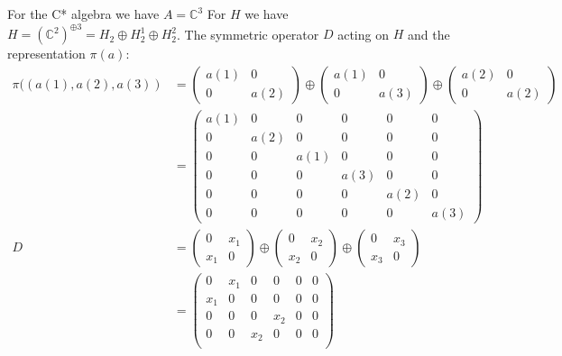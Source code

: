 \documentclass[a4paper]{article}
\newcounter{exercise}
\newenvironment{MyExercise}%
{\begin{mdframed}[style=exercisestyle]}{\end{mdframed}}
\theoremstyle{definition}
\theoremstyle{definition}
\theoremstyle{definition}
\theoremstyle{theorem}
\theoremstyle{theorem}
\begin{document}
\begin{MyExercise}
    For the C* algebra we have $A=\mathbb{C}^3$
    For $H$ we have $H = (\mathbb{C}^2)^{\oplus 3} = H_2 \oplus H_2^1 \oplus H_2^2$.
    The symmetric operator $D$ acting on $H$ and the representation $\pi (a)$:
    \begin{align}
        \pi((a(1), a(2), a(3)) &=
        \begin{pmatrix}
            a(1) & 0 \\ 0 & a(2)
        \end{pmatrix} \oplus
        \begin{pmatrix}
            a(1) & 0 \\ 0 & a(3)
        \end{pmatrix} \oplus
        \begin{pmatrix}
            a(2) & 0 \\ 0 & a(2)
        \end{pmatrix} \nonumber  \\
        & =
        \begin{pmatrix}
            a(1) & 0 & 0 & 0 & 0 & 0 \\
            0    & a(2) & 0 & 0 & 0 & 0 \\
            0    & 0 & a(1) & 0 & 0 & 0 \\
            0    & 0 & 0 & a(3) & 0 & 0 \\
            0    & 0 & 0 & 0 & a(2) & 0 \\
            0    & 0 & 0 & 0 & 0 & a(3)
        \end{pmatrix} \\
        D &=
        \begin{pmatrix}
            0 & x_1 \\ x_1 & 0
        \end{pmatrix} \oplus
        \begin{pmatrix}
            0 & x_2 \\ x_2 & 0
        \end{pmatrix} \oplus
        \begin{pmatrix}
            0 & x_3 \\ x_3 & 0
        \end{pmatrix} \nonumber \\
        &=
        \begin{pmatrix}
            0   & x_1 & 0 & 0 & 0 & 0 \\
            x_1 & 0   & 0 & 0 & 0 & 0 \\
            0   & 0   & 0 & x_2 & 0 & 0 \\
            0   & 0   & x_2 & 0 & 0 & 0 \\

\end{pmatrix}
\end{align}
\end{MyExercise}
\end{document}
